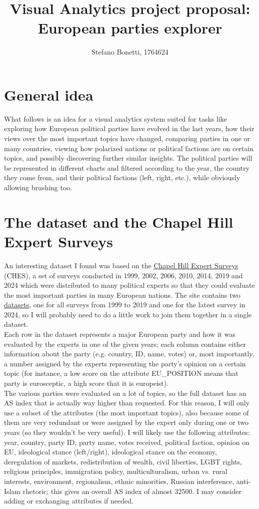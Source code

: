 \documentclass[]{article}
\title{Visual Analytics project proposal: European parties explorer}
\author{Stefano Bonetti, 1764624}
\date{}
\begin{document}
	
\maketitle
	
\section{General idea}
What follows is an idea for a visual analytics system suited for tasks like exploring how European political parties have evolved in the last years, how their views over the most important topics have changed, comparing parties in one or many countries, viewing how polarized nations or political factions are on certain topics, and possibly discovering further similar insights. The political parties will be represented in different charts and filtered according to the year, the country they come from, and their political factions (left, right, etc.), while obviously allowing brushing too.

\section{The dataset and the Chapel Hill Expert Surveys}
An interesting dataset I found was based on the \href{https://www.chesdata.eu/}{Chapel Hill Expert Surveys} (CHES), a set of surveys conducted in 1999, 2002, 2006, 2010, 2014, 2019 and 2024 which were distributed to many political experts so that they could evaluate the most important parties in many European nations. The site contains two \href{https://www.chesdata.eu/ches-europe}{datasets}, one for all surveys from 1999 to 2019 and one for the latest survey in 2024, so I will probably need to do a little work to join them together in a single dataset.\\
Each row in the dataset represents a major European party and how it was evaluated by the experts in one of the given years; each column contains either information about the party (e.g. country, ID, name, votes) or, most importantly, a number assigned by the experts representing the party's opinion on a certain topic (for instance, a low score on the attribute EU\_POSITION means that party is eurosceptic, a high score that it is europeist).\\
The various parties were evaluated on a lot of topics, so the full dataset has an AS index that is actually way higher than requested. For this reason, I will only use a subset of the attributes (the most important topics), also because some of them are very redundant or were assigned by the expert only during one or two years (so they wouldn't be very useful). I will likely use the following attributes: year, country, party ID, party name, votes received, political faction, opinion on EU, ideological stance (left/right), ideological stance on the economy, deregulation of markets, redistribution of wealth, civil liberties, LGBT rights, religious principles, immigration policy, multiculturalism, urban vs. rural interests, environment, regionalism, ethnic minorities, Russian interference, anti-Islam rhetoric; this gives an overall AS index of almost 32500. I may consider adding or exchanging attributes if needed.
\end{document}

